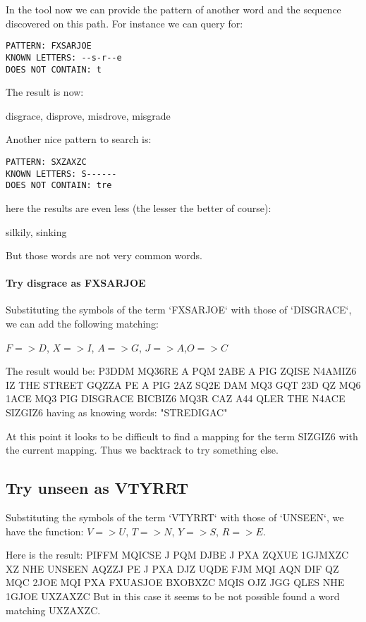 \documentclass{article}
\begin{document}
In the tool now we can provide the pattern of another word and the sequence discovered on this path. For instance we can query for:

\begin{verbatim}
PATTERN: FXSARJOE
KNOWN LETTERS: --s-r--e
DOES NOT CONTAIN: t
\end{verbatim}

The result is now:

disgrace, disprove, misdrove, misgrade

Another nice pattern to search is:

\begin{verbatim}
PATTERN: SXZAXZC
KNOWN LETTERS: S------
DOES NOT CONTAIN: tre
\end{verbatim}

here the results are even less (the lesser the better of course):

silkily, sinking

But those words are not very common words.

\paragraph{Try disgrace as FXSARJOE}

Substituting the symbols of the term `FXSARJOE` with those of `DISGRACE`, we can add the following matching:

$F => D$, $X => I$,  $A => G$, $J=>A$,$O=>C$

The result would be:
\bigbreak
P3DDM MQ36RE A PQM 2ABE A PIG ZQISE N4AMIZ6 IZ THE STREET GQZZA PE A PIG 2AZ SQ2E DAM MQ3 GQT 23D QZ MQ6 1ACE MQ3 PIG DISGRACE BICBIZ6 MQ3R CAZ A44 QLER THE N4ACE SIZGIZ6
\bigbreak
having as knowing words: "STREDIGAC"

At this point it looks to be difficult to find a mapping for the term SIZGIZ6 with the current mapping. Thus we backtrack to try something else.

\subsection{Try unseen as VTYRRT}

Substituting the symbols of the term `VTYRRT` with those of `UNSEEN`, we have the function:
$V => U$, $T => N$, $Y => S$, $R => E$.

Here is the result:
\bigbreak
PIFFM MQICSE J PQM DJBE J PXA ZQXUE 1GJMXZC XZ NHE UNSEEN AQZZJ PE J PXA DJZ UQDE FJM MQI AQN DIF QZ MQC 2JOE MQI PXA FXUASJOE BXOBXZC MQIS OJZ JGG QLES NHE 1GJOE UXZAXZC
\bigbreak
But in this case it seems to be not possible found a word matching UXZAXZC.
\end{document}
